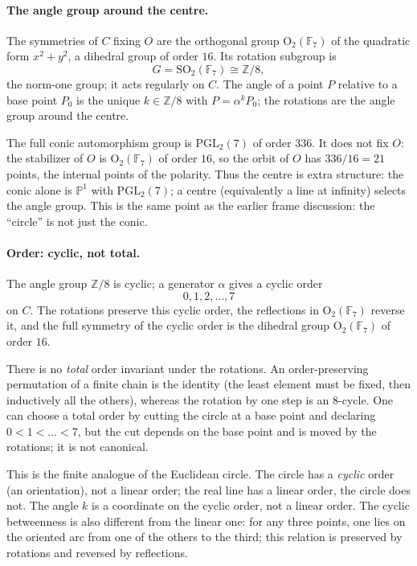 \documentclass[11pt]{article}
\theoremstyle{definition}
\theoremstyle{remark}
\newcommand{\F}{\mathbb{F}}
\newcommand{\Z}{\mathbb{Z}}
\begin{document}
\paragraph{The angle group around the centre.}
The symmetries of $C$ fixing $O$ are the orthogonal group
$\mathrm{O}_2(\F_7)$ of the quadratic form $x^2+y^2$, a dihedral group of
order $16$.  Its rotation subgroup is
\[
  G=\mathrm{SO}_2(\F_7)\cong\Z/8,
\]
the norm-one group; it acts regularly on $C$.  The angle of a point $P$ relative
to a base point $P_0$ is the unique $k\in\Z/8$ with $P=\alpha^k P_0$; the
rotations are the angle group around the centre.

The full conic automorphism group is $\mathrm{PGL}_2(7)$ of order $336$.  It
does not fix $O$: the stabilizer of $O$ is $\mathrm{O}_2(\F_7)$ of order $16$,
so the orbit of $O$ has $336/16=21$ points, the internal points of the
polarity.  Thus the centre is extra structure: the conic alone is
$\mathbb P^1$ with $\mathrm{PGL}_2(7)$; a centre (equivalently a line at
infinity) selects the angle group.  This is the same point as the earlier
frame discussion: the ``circle'' is not just the conic.

\paragraph{Order: cyclic, not total.}
The angle group $\Z/8$ is cyclic; a generator $\alpha$ gives a cyclic order
\[
  0,1,2,\dots,7
\]
on $C$.  The rotations preserve this cyclic order, the reflections in
$\mathrm{O}_2(\F_7)$ reverse it, and the full symmetry of the cyclic order is
the dihedral group $\mathrm{O}_2(\F_7)$ of order $16$.

There is no \emph{total} order invariant under the rotations.  An
order-preserving permutation of a finite chain is the identity (the least
element must be fixed, then inductively all the others), whereas the rotation
by one step is an $8$-cycle.  One can choose a total order by cutting the circle
at a base point and declaring $0<1<\dots<7$, but the cut depends on the base
point and is moved by the rotations; it is not canonical.

This is the finite analogue of the Euclidean circle.  The circle has a
\emph{cyclic} order (an orientation), not a linear order; the real line has a
linear order, the circle does not.  The angle $k$ is a coordinate on the cyclic
order, not a linear order.  The cyclic betweenness is also different from the
linear one: for any three points, one lies on the oriented arc from one of the
others to the third; this relation is preserved by rotations and reversed by
reflections.
\end{document}
